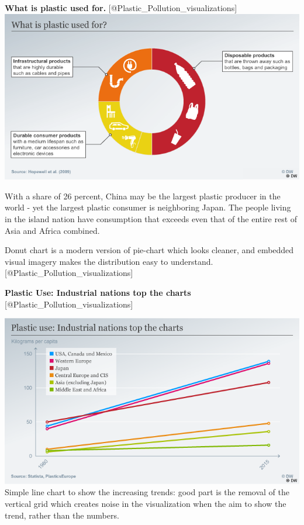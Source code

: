 \documentclass[]{book}
\theoremstyle{definition}
\theoremstyle{definition}
\theoremstyle{definition}
\theoremstyle{remark}
\begin{document}
\textbf{What is plastic used for.}
{[}@Plastic\_Pollution\_visualizations{]}
\includegraphics{images/use_of_plastic.png}

With a share of 26 percent, China may be the largest plastic producer in
the world - yet the largest plastic consumer is neighboring Japan. The
people living in the island nation have consumption that exceeds even
that of the entire rest of Asia and Africa combined.

Donut chart is a modern version of pie-chart which looks cleaner, and
embedded visual imagery makes the distribution easy to understand.
{[}@Plastic\_Pollution\_visualizations{]}

\textbf{Plastic Use: Industrial nations top the charts}
{[}@Plastic\_Pollution\_visualizations{]}

\includegraphics{images/plastic_use.png} Simple line chart to show the
increasing trends: good part is the removal of the vertical grid which
creates noise in the visualization when the aim to show the trend,
rather than the numbers.
\end{document}
